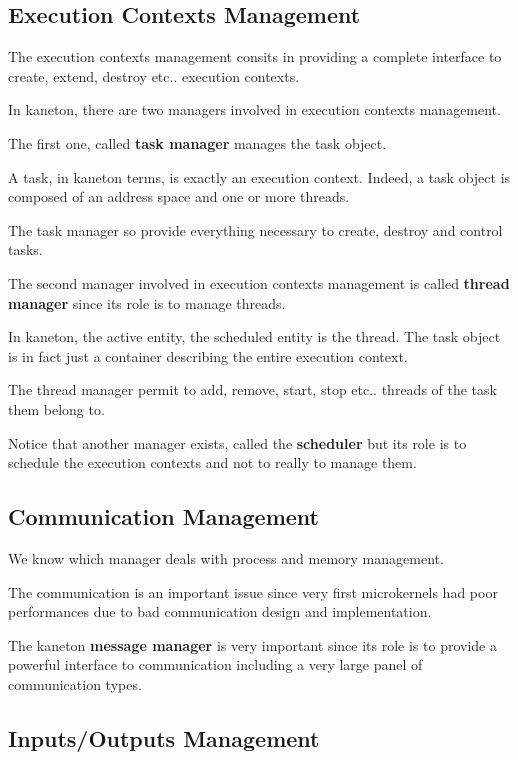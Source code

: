 \subsection{Execution Contexts Management}

The execution contexts management consits in providing a complete
interface to create, extend, destroy etc.. execution contexts.

In kaneton, there are two managers involved in execution contexts
management.

The first one, called \textbf{task manager} manages the task object.

A task, in kaneton terms, is exactly an execution context. Indeed,
a task object is composed of an address space and one or more
threads.

The task manager so provide everything necessary to create, destroy
and control tasks.

The second manager involved in execution contexts management is called
\textbf{thread manager} since its role is to manage threads.

In kaneton, the active entity, the scheduled entity is the thread. The
task object is in fact just a container describing the entire execution
context.

The thread manager permit to add, remove, start, stop etc.. threads
of the task them belong to.

Notice that another manager exists, called the \textbf{scheduler} but
its role is to schedule the execution contexts and not to really to
manage them.

%
%

\subsection{Communication Management}

We know which manager deals with process and memory management.

The communication is an important issue since very first microkernels
had poor performances due to bad communication design and implementation.

The kaneton \textbf{message manager} is very important since its
role is to provide a powerful interface to communication including
a very large panel of communication types.

%
%

\subsection{Inputs/Outputs Management}

